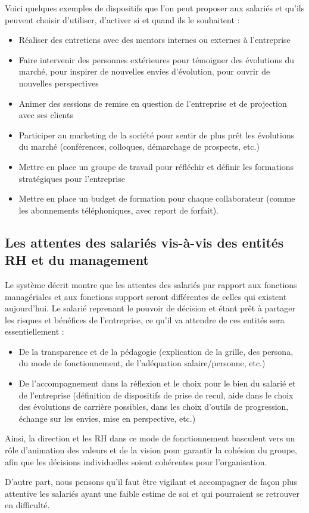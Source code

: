 \documentclass[12pt]{article}
\begin{document}
 Voici quelques exemples de dispositifs que l’on peut proposer aux salariés et qu’ils peuvent choisir d’utiliser, d’activer si et quand ils le souhaitent :
 \begin{itemize}
   \item Réaliser des entretiens avec des mentors internes ou externes à l’entreprise
   \item Faire intervenir des personnes extérieures pour témoigner des évolutions du marché, pour inspirer de nouvelles envies d’évolution, pour ouvrir de nouvelles perspectives
   \item Animer des sessions de remise en question de l’entreprise et de projection avec ses clients
   \item Participer au marketing de la société pour sentir de plus prêt les évolutions du marché (conférences, colloques, démarchage de prospects, etc.)
   \item Mettre en place un groupe de travail pour réfléchir et définir les formations stratégiques pour l’entreprise
   \item Mettre en place un budget de formation pour chaque collaborateur (comme les abonnements téléphoniques, avec report de forfait).
 \end{itemize}

\subsection{Les attentes des salariés vis-à-vis des entités RH et du management }

 Le système décrit montre que les attentes des salariés par rapport aux fonctions managériales et aux fonctions support seront différentes de celles qui existent aujourd’hui. Le salarié reprenant le pouvoir de décision et étant prêt à partager les risques et bénéfices de l’entreprise, ce qu’il va attendre de ces entités sera essentiellement : 
  \begin{itemize}
    \item De la transparence et de la pédagogie (explication de la grille, des persona, du mode de fonctionnement, de l’adéquation salaire/personne, etc.)
    \item De l’accompagnement dans la réflexion et le choix pour le bien du salarié et de l’entreprise (définition de dispositifs de prise de recul, aide dans le choix des évolutions de carrière possibles, dans les choix d’outils de progression, échange sur les envies, mise en perspective, etc.)
  \end{itemize}

 Ainsi, la direction et les RH dans ce mode de fonctionnement basculent vers un rôle d’animation des valeurs et de la vision pour garantir la cohésion du groupe, afin que les décisions individuelles soient cohérentes pour l’organisation. 

 D’autre part, nous pensons qu’il faut être vigilant et accompagner de façon plus attentive les salariés ayant une faible estime de soi et qui pourraient se retrouver en difficulté.

\nocite{*}
{}

\end{document}
